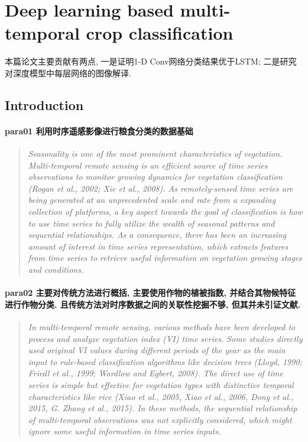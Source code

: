 \section{Deep learning based multi-temporal crop classification}
本篇论文主要贡献有两点, 一是证明1-D Conv网络分类结果优于LSTM; 二是研究对深度模型中每层网络的图像解译.

\subsection{Introduction}
\paragraph*{para01
    \textcolor[RGB]{17, 205, 29}{利用时序遥感影像进行粮食分类的数据基础}}
\begin{quotation}
    \itshape
    Seasonality is one of the most prominent characteristics of vegetation. Multi-temporal remote sensing is an efficient source of time series observations to monitor growing dynamics for vegetation classification (Rogan et al., 2002; Xie et al., 2008). As remotely-sensed time series are being generated at an unprecedented scale and rate from a expanding collection of platforms, a key aspect towards the goal of classification is how to use time series to fully utilize the wealth of seasonal patterns and sequential relationships. As a consequence, there has been an increasing amount of interest in time series representation, which extracts features from time series to retrieve useful information on vegetation growing stages and conditions.
\end{quotation}

\paragraph*{para02
    \textcolor[RGB]{17, 205, 29}{主要对传统方法进行概括, 主要使用作物的植被指数, 并结合其物候特征进行作物分类. 且传统方法对时序数据之间的关联性挖掘不够, 但其并未引证文献.}}
\begin{quotation}
    \itshape
    In multi-temporal remote sensing, various methods have been developed to process and analyze vegetation index (VI) time series. Some studies directly used original VI values during different periods of the year as the main input to rule-based classification algorithms like decision trees (Lloyd, 1990; Friedl et al., 1999; Wardlow and Egbert, 2008). The direct use of time series is simple but effective for vegetation types with distinctive temporal characteristics like rice (Xiao et al., 2005, Xiao et al., 2006, Dong et al., 2015, G. Zhang et al., 2015). In these methods, the sequential relationship of multi-temporal observations was not explicitly considered, which might ignore some useful information in time series inputs.
\end{quotation}

